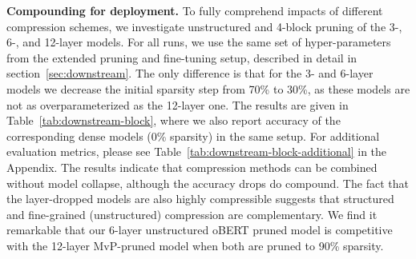 \documentclass[11pt]{article}
\begin{document}
\noindent\textbf{Compounding for deployment.} To fully comprehend impacts of different compression schemes, we investigate unstructured and 4-block pruning of the 3-, 6-, and 12-layer models. For all runs, we use the same set of hyper-parameters from the extended pruning and fine-tuning setup, described in detail in section~\ref{sec:downstream}. The only difference is that for the 3- and 6-layer models we decrease the initial sparsity step from 70\% to 30\%, as these models are not as overparameterized as the 12-layer one. The results are given in Table~\ref{tab:downstream-block}, where we also report accuracy of the corresponding dense models (0\% sparsity) in the same setup. For additional evaluation metrics, please see Table~\ref{tab:downstream-block-additional} in the Appendix. The results indicate that compression methods can be combined without model collapse, although the accuracy drops do compound. The fact that the layer-dropped models are also highly compressible suggests that structured and fine-grained (unstructured) compression are complementary. We find it remarkable that our 6-layer unstructured oBERT pruned model is competitive with the 12-layer MvP-pruned model when both are pruned to 90\% sparsity.
\end{document}
